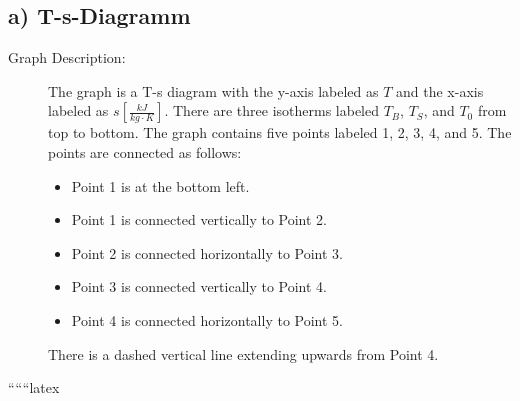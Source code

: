 \subsection*{a) T-s-Diagramm}

\begin{description}
    \item[Graph Description:] The graph is a T-s diagram with the y-axis labeled as \( T \) and the x-axis labeled as \( s \left[ \frac{kJ}{kg \cdot K} \right] \). There are three isotherms labeled \( T_B \), \( T_S \), and \( T_0 \) from top to bottom. The graph contains five points labeled 1, 2, 3, 4, and 5. The points are connected as follows:
    \begin{itemize}
        \item Point 1 is at the bottom left.
        \item Point 1 is connected vertically to Point 2.
        \item Point 2 is connected horizontally to Point 3.
        \item Point 3 is connected vertically to Point 4.
        \item Point 4 is connected horizontally to Point 5.
    \end{itemize}
    There is a dashed vertical line extending upwards from Point 4.
\end{description}

``````latex